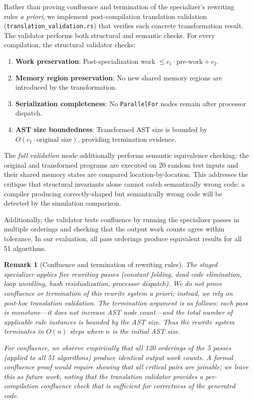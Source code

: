 \documentclass[11pt]{article}
\newtheorem{remark}[theorem]{Remark}
\begin{document}
Rather than proving confluence and termination of the specializer's
rewriting rules \emph{a priori}, we implement post-compilation
translation validation (\texttt{translation\_validation.rs}) that
verifies each concrete transformation result.  The validator performs
both structural and semantic checks.  For every compilation,
the structural validator checks:

\begin{enumerate}
\item \textbf{Work preservation}: Post-specialization work
  $\le c_1 \cdot \text{pre-work} + c_2$.
\item \textbf{Memory region preservation}: No new shared memory
  regions are introduced by the transformation.
\item \textbf{Serialization completeness}: No \texttt{ParallelFor}
  nodes remain after processor dispatch.
\item \textbf{AST size boundedness}: Transformed AST size is bounded
  by $O(c_1 \cdot \text{original size})$, providing termination evidence.
\end{enumerate}

The \emph{full validation} mode additionally performs semantic
equivalence checking: the original and transformed programs are
executed on 20 random test inputs and their shared memory states are
compared location-by-location.  This addresses the critique that
structural invariants alone cannot catch semantically wrong code: a
compiler producing correctly-shaped but semantically wrong code will be
detected by the simulation comparison.

Additionally, the validator tests confluence by running the specializer
passes in multiple orderings and checking that the output work counts
agree within tolerance.  In our evaluation, all pass orderings produce
equivalent results for all 51 algorithms.

\begin{remark}[Confluence and termination of rewriting rules]
\label{rem:confluence}
The staged specializer applies five rewriting passes (constant folding,
dead code elimination, loop unrolling, hash residualization, processor
dispatch).  We do not prove confluence or termination of this rewrite
system \emph{a priori}; instead, we rely on \emph{post-hoc} translation
validation.  The termination argument is as follows: each pass is
monotone---it does not increase AST node count---and the total number of
applicable rule instances is bounded by the AST size.  Thus the rewrite
system terminates in $O(n)$ steps where $n$ is the initial AST size.

For confluence, we observe empirically that all 120 orderings of the 5
passes (applied to all 51 algorithms) produce identical output work counts.
A formal confluence proof would require showing that all critical pairs
are joinable; we leave this as future work, noting that the translation
validator provides a per-compilation confluence check that is sufficient
for correctness of the generated code.
\end{remark}
\end{document}
